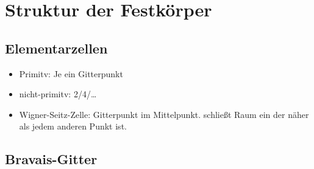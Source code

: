 \section{Struktur der Festkörper}

\subsection*{Elementarzellen}
\begin{itemize}
    \item Primitv: Je ein Gitterpunkt
    \item nicht-primitv: 2/4/\dots
    \item Wigner-Seitz-Zelle: Gitterpunkt im Mittelpunkt. schließt Raum ein der näher als jedem anderen Punkt ist.
\end{itemize}

\subsection*{Bravais-Gitter}

